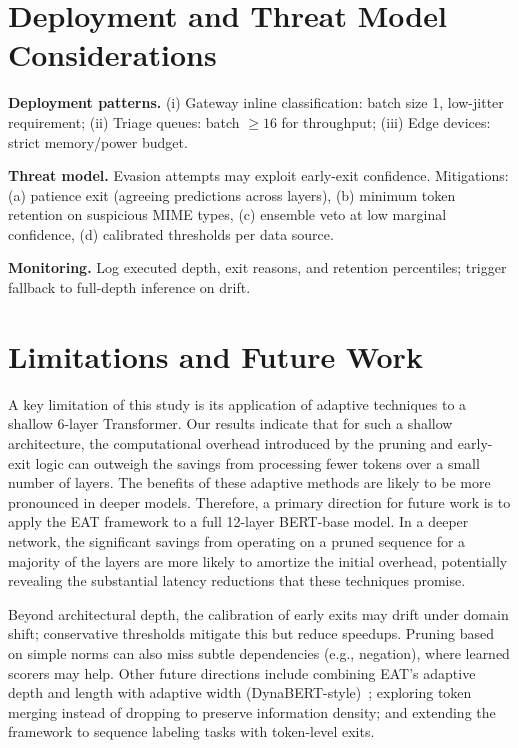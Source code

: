 \documentclass[11pt,letterpaper]{article}
\theoremstyle{plain}
\newcommand{\eat}{\textsc{EAT}}
\newcommand{\bert}{\textsc{BERT}}
\begin{document}
\section{Deployment and Threat Model Considerations}
\textbf{Deployment patterns.} (i) Gateway inline classification: batch size 1, low-jitter requirement; (ii) Triage queues: batch $\ge 16$ for throughput; (iii) Edge devices: strict memory/power budget.

\textbf{Threat model.} Evasion attempts may exploit early-exit confidence. Mitigations: (a) patience exit (agreeing predictions across layers), (b) minimum token retention on suspicious MIME types, (c) ensemble veto at low marginal confidence, (d) calibrated thresholds per data source.

\textbf{Monitoring.} Log executed depth, exit reasons, and retention percentiles; trigger fallback to full-depth inference on drift.

\section{Limitations and Future Work}
\label{sec:limitations}
A key limitation of this study is its application of adaptive techniques to a shallow 6-layer Transformer. Our results indicate that for such a shallow architecture, the computational overhead introduced by the pruning and early-exit logic can outweigh the savings from processing fewer tokens over a small number of layers. The benefits of these adaptive methods are likely to be more pronounced in deeper models. Therefore, a primary direction for future work is to apply the \eat{} framework to a full 12-layer \bert{}-base model. In a deeper network, the significant savings from operating on a pruned sequence for a majority of the layers are more likely to amortize the initial overhead, potentially revealing the substantial latency reductions that these techniques promise.

Beyond architectural depth, the calibration of early exits may drift under domain shift; conservative thresholds mitigate this but reduce speedups. Pruning based on simple norms can also miss subtle dependencies (e.g., negation), where learned scorers may help. Other future directions include combining \eat{}'s adaptive depth and length with adaptive width (DynaBERT-style)~\citep{hou2020dynabert}; exploring token merging instead of dropping to preserve information density; and extending the framework to sequence labeling tasks with token-level exits.
\end{document}
